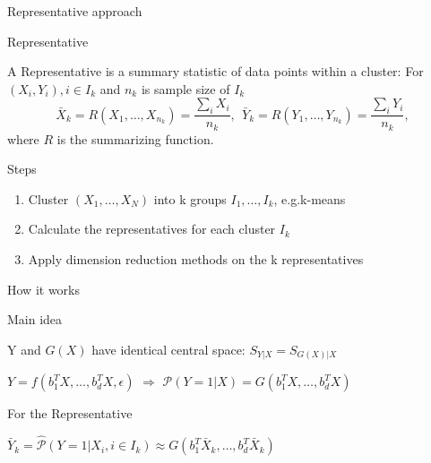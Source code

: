 \documentclass[ignorenonframetext,]{beamer}
\providecommand{\tightlist}{%
  \setlength{\itemsep}{0pt}\setlength{\parskip}{0pt}}
\begin{document}
\begin{frame}{Representative approach}

\begin{block}{Representative}

A Representative is a summary statistic of data points within a cluster:
For \((X_i, Y_i), i \in I_k\) and \(n_k\) is sample size of \(I_k\) \[
  \bar{X}_k = R(X_{1}, \dots, X_{n_k}) = \frac{\sum_i X_i}{n_k},~~ \bar{Y}_k = R(Y_{1}, \dots, Y_{n_k}) = \frac{\sum_i Y_i}{n_k},
\] where \(R\) is the summarizing function.

\end{block}

\begin{block}{Steps}

\begin{enumerate}
\def\labelenumi{\arabic{enumi}.}
\tightlist
\item
  Cluster \((X_1, \dots,X_N)\) into k groups \(I_1, \dots, I_k\),
  e.g.k-means
\item
  Calculate the representatives for each cluster \(I_k\)
\item
  Apply dimension reduction methods on the k representatives
\end{enumerate}

\end{block}

\end{frame}

\begin{frame}{How it works}

\begin{block}{Main idea}

Y and \(G(X)\) have identical central space: \(S_{Y|X} = S_{G(X)|X}\)

\begin{center}
$Y = f(b_1^TX, \dots, b_d^TX,\epsilon)$
$\Rightarrow$
$\mathcal{P}(Y = 1 |X) = G(b_1^TX, \dots, b_d^TX)$
\end{center}

\end{block}

\begin{block}{For the Representative}

\begin{center}
$\bar{Y}_k = \hat{\mathcal{P}}(Y = 1|X_i, i\in I_k) \approx G(b_1^T\bar{X}_k, \dots, b_d^T\bar{X}_k)$
\end{center}

\end{block}

\end{frame}
\end{document}
